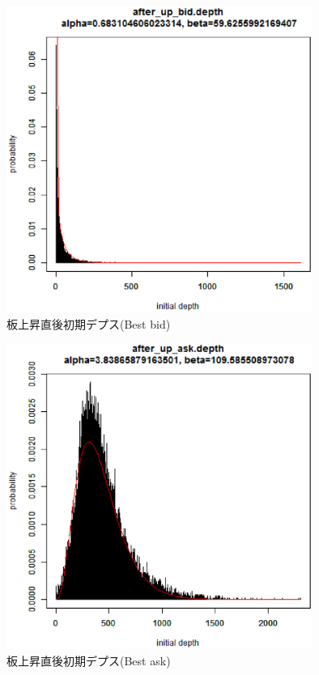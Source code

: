 \documentclass[a4j,papersize,disablejfam,slide,14pt]{jsarticle}
\begin{document}
    \begin{figure}[H]
        \begin{center}
    	\includegraphics[clip,width = 10.0cm]{graphics/after_up_bid.eps}
        \end{center}
        \caption{板上昇直後初期デプス({\rm Best bid})}
    \end{figure}
    \begin{figure}[H]
        \begin{center}
    	\includegraphics[clip,width = 10.0cm]{graphics/after_up_ask.eps}
        \end{center}
        \caption{板上昇直後初期デプス({\rm Best ask})}
    \end{figure}
\end{document}
